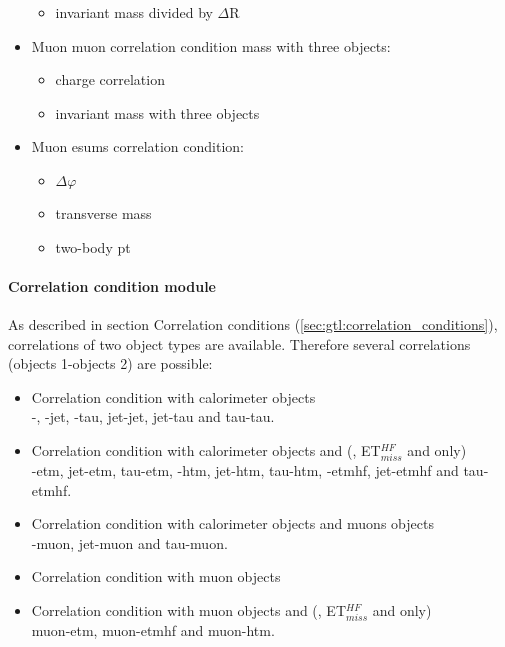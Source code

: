 \begin{itemize}
\begin{itemize}
\item invariant mass divided by $\Delta$R
\end{itemize}
\item Muon muon correlation condition mass with three objects:
\begin{itemize}
\item charge correlation
\item invariant mass with three objects
\end{itemize}
\item Muon esums correlation condition:
\begin{itemize}
\item $\Delta\varphi$
\item transverse mass
\item two-body pt
\end{itemize}
\end{itemize}

\paragraph{Correlation condition module}
\label{sec:gtl:correlation_condition_modules}

As described in section Correlation conditions (\ref{sec:gtl:correlation_conditions}), correlations of two object types are available. Therefore several correlations (objects 1-objects 2) are possible:
\begin{itemize}
\item Correlation condition with calorimeter objects\\
\egamma-\egamma, \egamma-jet, \egamma-tau, jet-jet, jet-tau and tau-tau.
\item Correlation condition with calorimeter objects and \esums (\etm, ET$_{miss}^{HF}$ and \htm only)\\
\egamma-etm, jet-etm, tau-etm, \egamma-htm, jet-htm, tau-htm, \egamma-etmhf, jet-etmhf and tau-etmhf.
\item Correlation condition with calorimeter objects and muons objects\\
\egamma-muon, jet-muon and tau-muon.
\item Correlation condition with muon objects\\
\item Correlation condition with muon objects and \esums (\etm, ET$_{miss}^{HF}$ and \htm only)\\
muon-etm, muon-etmhf and muon-htm.
\end{itemize}


